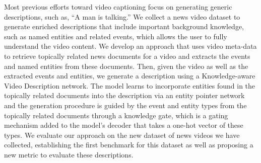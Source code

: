 Most previous efforts toward video captioning focus on generating generic descriptions, such as, ``A man is talking.'' We collect a news video dataset to generate enriched descriptions that include important background knowledge, such as named entities and related events, which allows the user to fully understand the video content. We develop an approach that uses video meta-data to retrieve topically related news documents for a video and extracts the events and named entities from these documents. Then, given the video as well as the extracted events and entities, we generate a description using a Knowledge-aware Video Description network. The model learns to incorporate entities found in the topically related documents into the description via an entity pointer network and the generation procedure is guided by the event and entity types from the topically related documents through a knowledge gate, which is a gating mechanism added to the model's decoder that takes a one-hot vector of these types. We evaluate our approach on the new dataset of news videos we have collected, establishing the first benchmark for this dataset as well as proposing a new metric to evaluate these descriptions.
